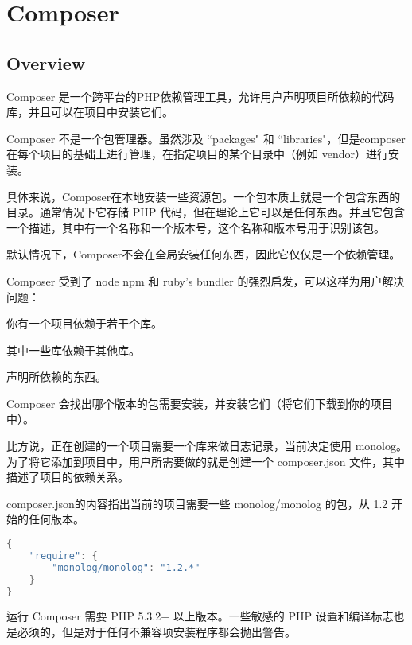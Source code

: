 \part{Composer}



\chapter{Overview}

Composer 是一个跨平台的PHP依赖管理工具，允许用户声明项目所依赖的代码库，并且可以在项目中安装它们。

Composer 不是一个包管理器。虽然涉及 ``packages" 和 ``libraries"，但是composer在每个项目的基础上进行管理，在指定项目的某个目录中（例如 vendor）进行安装。

具体来说，Composer在本地安装一些资源包。一个包本质上就是一个包含东西的目录。通常情况下它存储 PHP 代码，但在理论上它可以是任何东西。并且它包含一个描述，其中有一个名称和一个版本号，这个名称和版本号用于识别该包。

默认情况下，Composer不会在全局安装任何东西，因此它仅仅是一个依赖管理。

Composer 受到了 node npm 和 ruby's bundler 的强烈启发，可以这样为用户解决问题：

\begin{compactenum}
\item 你有一个项目依赖于若干个库。

\item 其中一些库依赖于其他库。

\item 声明所依赖的东西。

\item Composer 会找出哪个版本的包需要安装，并安装它们（将它们下载到你的项目中）。
\end{compactenum}

比方说，正在创建的一个项目需要一个库来做日志记录，当前决定使用 monolog。为了将它添加到项目中，用户所需要做的就是创建一个 composer.json 文件，其中描述了项目的依赖关系。

composer.json的内容指出当前的项目需要一些 monolog/monolog 的包，从 1.2 开始的任何版本。

\begin{lstlisting}[language=Java]
{
    "require": {
        "monolog/monolog": "1.2.*"
    }
}
\end{lstlisting}

运行 Composer 需要 PHP 5.3.2+ 以上版本。一些敏感的 PHP 设置和编译标志也是必须的，但是对于任何不兼容项安装程序都会抛出警告。

